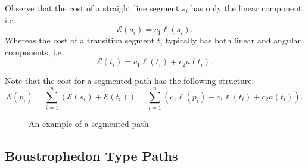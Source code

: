 \documentclass[../main.tex]{subfiles}
\begin{document}
\begin{remark}
	Observe that the cost of a straight line segment $s_i$ has only the linear component, i.e.
	\begin{equation}
		\mathcal{E}(s_i)=c_1\ell(s_i).
	\end{equation}
	Whereas the cost of a transition segment $t_i$ typically has both linear and angular components, i.e.
	\begin{equation}
		\mathcal{E}(t_i)=c_1\ell(t_i)+c_2a(t_i).
	\end{equation}
	\RE
\end{remark}

Note that the cost for a segmented path has the following structure:
\begin{equation}
	\label{eq:segmented_cost}
	\mathcal{E}(p_i)=\sum_{i=1}^n(\mathcal{E}(s_i)+\mathcal{E}(t_i))=\sum_{i=1}^n(c_1\ell(p_i)+c_1\ell(t_i)+c_2a(t_i)).
\end{equation}

\begin{figure}
	\centering
	
	\caption{An example of a segmented path.}
	\label{fig:segmented}
\end{figure}


\subsection{Boustrophedon Type Paths}
\label{subsection:boustrophedon_type_path}

\end{document}
